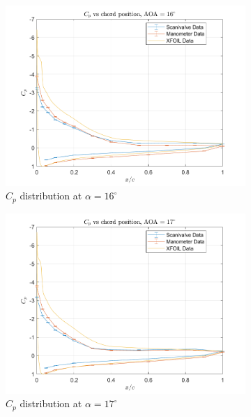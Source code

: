 \documentclass[runningheads]{llncs}
\begin{document}
\begin{figure}[H]
\begin{subfigure}[b]{0.3\textwidth}
        \includegraphics[width=\textwidth]{figures/AOA16.png}
        \caption{$C_p$ distribution at $\alpha = 16^\circ$}
        \label{fig:cp_16}
    \end{subfigure}
    \begin{subfigure}[b]{0.3\textwidth}
        \centering
        \includegraphics[width=\textwidth]{figures/AOA17.png}
        \caption{$C_p$ distribution at $\alpha = 17^\circ$}
        \label{fig:cp_17}
    \end{subfigure}
    \begin{subfigure}[b]{0.3\textwidth}
        \centering

\end{subfigure}
\end{figure}
\end{document}
